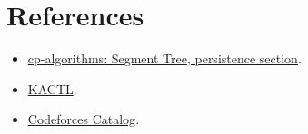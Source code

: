 \section*{References}

\begin{itemize}
  \item \href{https://cp-algorithms.com/data_structures/segment_tree.html}{cp-algorithms: Segment Tree, persistence section}.
  \item \href{https://github.com/kth-competitive-programming/kactl}{KACTL}.
  \item \href{https://codeforces.com/catalog}{Codeforces Catalog}.
\end{itemize}
